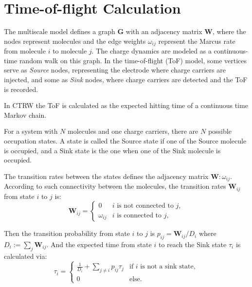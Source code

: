 \documentclass[letterpaper,12pt]{article}
\begin{document}

\section{Time-of-flight Calculation}
The multiscale model defines a graph $\mathbf{G}$ with an adjacency matrix $\mathbf{W}$, where the nodes represent molecules and the edge weights $\omega_{ij}$ represent the Marcus rate from molecule $i$ to molecule $j$. 
The charge dynamics are modeled as a continuous-time random walk on this graph. In the time-of-flight (ToF) model, some vertices serve as \textit{Source} nodes, representing the electrode where charge carriers are injected, and some as \textit{Sink} nodes, where charge carriers are detected and the ToF is recorded.

In CTRW the ToF is calculated as the expected hitting time of a continuous time Markov chain.

For a system with $N$ molecules and one charge carriers, there are $N$ possible occupation states. A state is called the Source state if one of the Source molecule is occupied, and a Sink state is the one when one of the Sink molecule is occupied.

The transition rates between the states defines the adjacency matrix $\mathbf{W}:\omega_{ij}$.
According to such connectivity between the molecules, the transition rates $\mathbf{W}_{ij}$ from state $i$ to $j$ is:
\begin{equation}\label{eq:transition_rates}
	\mathbf{W}_{ij} =
	\begin{cases}
	     0			&  i \text{ is not connected to } j,\\
         \omega_{ij}   &  i \text{ is connected to } j,
	\end{cases}
\end{equation}

Then the transition probability from state $i$ to $j$ is $p_{ij} = \mathbf{W}_{ij}/D_i$ where $D_i := \sum_{j} \mathbf{W}_{ij}$.
And the expected time from state $i$ to reach the Sink state $\tau_i$ is calculated via: 
\begin{equation}\label{eq:hitting_time}
	\tau_i = \begin{cases}
		\frac{1}{D_i} + \sum_{j \ne i} p_{ij} \tau_{j} &\text{if $i$ is not a sink state},\\
		0 &\text{else.} 
	\end{cases}
\end{equation} 
\end{document}
